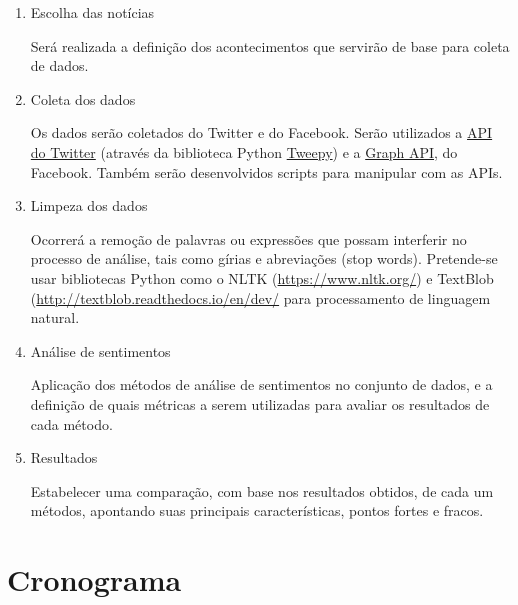 \documentclass[12pt,article,a4paper,brazil,oldfontcommands,oneside]{abntex2}
\begin{document}
\begin{enumerate}
    \item Escolha das notícias
    
Será realizada a definição dos acontecimentos que servirão de base para coleta de dados.

    \item Coleta dos dados

Os dados serão coletados do Twitter e do Facebook. Serão utilizados a \href{https://developer.twitter.com/en/docs/api-reference-index}{API do Twitter} (através da biblioteca Python \href{http://www.tweepy.org/}{Tweepy}) e a \href{https://developers.facebook.com/docs/graph-api?locale=pt_BR}{Graph API}, do Facebook. Também serão desenvolvidos scripts para manipular com as APIs.
    
    \item Limpeza dos dados

Ocorrerá a remoção de palavras ou expressões que possam interferir no processo de análise, tais como gírias e abreviações (stop words). Pretende-se usar bibliotecas Python como o NLTK (\url{https://www.nltk.org/}) e TextBlob (\url{http://textblob.readthedocs.io/en/dev/} para processamento de linguagem natural.

    \item Análise de sentimentos

Aplicação dos métodos de análise de sentimentos no conjunto de dados, e a definição de quais métricas a serem utilizadas para avaliar os resultados de cada método. 

    \item Resultados

Estabelecer uma comparação, com base nos resultados obtidos, de cada um métodos, apontando suas principais características, pontos fortes e fracos.

\end{enumerate}


\section{Cronograma}
\end{document}
